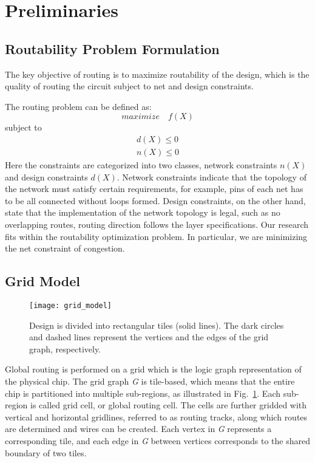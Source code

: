 \section{Preliminaries}
\label{sec:prelim}

\subsection{Routability Problem Formulation}
The key objective of routing is to maximize routability of the design, which is the quality of routing the circuit subject to net and design constraints.

The routing problem can be defined as:
\begin{equation}
maximize \quad f(X) 
\end{equation}
subject to
\begin{equation}
\begin{split}
d(X) \leq 0 \\
n(X) \leq 0
\end{split}
\end{equation}
Here the constraints are categorized into two classes, network constraints $n(X)$ and design constraints $d(X)$. Network constraints indicate that the topology of the network must satisfy certain requirements, for example, pins of each net has to be all connected without loops formed. Design constraints, on the other hand, state that the implementation of the network topology is legal, such as no overlapping routes, routing direction follows the layer specifications. Our research fits within the routability optimization problem. In particular, we are minimizing the net constraint of congestion.

\subsection{Grid Model}
\label{subsec:grid model}
\begin{figure}[htbp]
	\centerline{\texttt{[image: grid\_model]}}
	\caption{Design is divided into rectangular tiles (solid lines). The dark
		circles and dashed lines represent the vertices and the edges of the grid graph, respectively.}
	\label{fig:grid_model}
\end{figure}

Global routing is performed on a grid which is the logic graph representation of the physical chip. The grid graph \emph{G} is tile-based, which means that the entire chip is partitioned into multiple sub-regions, as illustrated in Fig.~\ref{fig:grid_model}. Each sub-region is called grid cell, or global routing cell. The cells are further gridded with vertical and horizontal gridlines, referred to as routing tracks, along which routes are determined and wires can be created. Each vertex in \emph{G} represents a corresponding tile, and each edge in \emph{G} between vertices corresponds to the shared boundary of two tiles.

